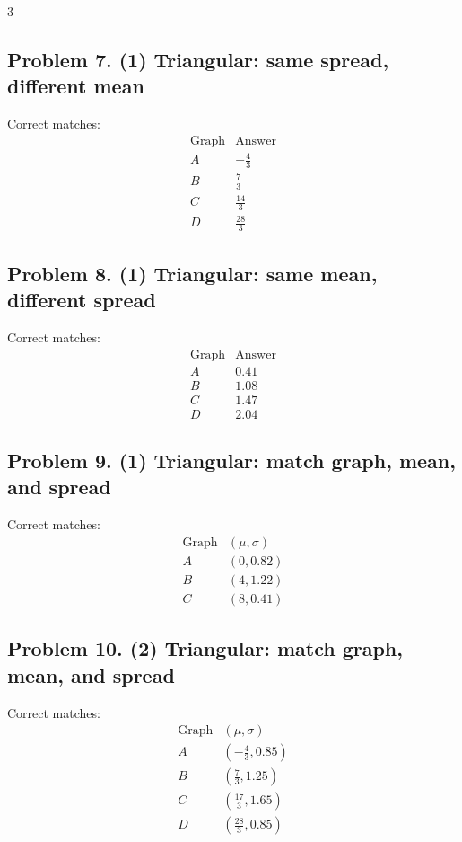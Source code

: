 \begin{multicols}{3}
\subsection*{Problem 7. (1) Triangular: same spread, different mean}
Correct matches:
\[
\begin{array}{c|c}
\text{Graph} & \text{Answer} \\
\hline
A & -\frac{4}{3} \\
B & \frac{7}{3} \\
C & \frac{14}{3} \\
D & \frac{28}{3}
\end{array}
\]

\subsection*{Problem 8. (1) Triangular: same mean, different spread}
Correct matches:
\[
\begin{array}{c|c}
\text{Graph} & \text{Answer} \\
\hline
A & 0.41 \\
B & 1.08 \\
C & 1.47 \\
D & 2.04
\end{array}
\]

\subsection*{Problem 9. (1) Triangular: match graph, mean, and spread}
Correct matches:
\[
\begin{array}{c|c}
\text{Graph} & (\mu,\sigma) \\
\hline
A & (0,0.82) \\
B & (4,1.22) \\
C & (8,0.41)
\end{array}
\]

\subsection*{Problem 10. (2) Triangular: match graph, mean, and spread}
Correct matches:
\[
\begin{array}{c|c}
\text{Graph} & (\mu,\sigma) \\
\hline
A & \left(-\frac{4}{3},0.85\right) \\
B & \left(\frac{7}{3},1.25\right) \\
C & \left(\frac{17}{3},1.65\right) \\
D & \left(\frac{28}{3},0.85\right)
\end{array}
\]


\end{multicols}

